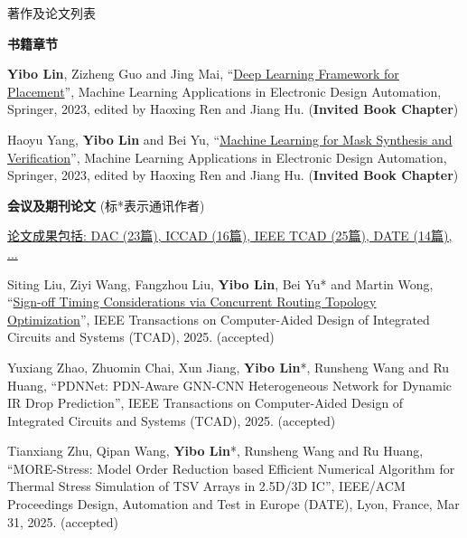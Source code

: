 \begin{rSection}{著作及论文列表}



\textbf{书籍章节}
        

\begin{description}[font=\normalfont, rightmargin=2em]
    

\item[{[B3]}]{
        \textbf{Yibo Lin}, Zizheng Guo and Jing Mai, 
    ``\href{https://doi.org/10.1007/978-3-031-13074-8}{Deep Learning Framework for Placement}'', 
    Machine Learning Applications in Electronic Design Automation, Springer, 2023, edited by Haoxing Ren and Jiang Hu.
    (\textbf{Invited Book Chapter})
}
            

\item[{[B2]}]{
        Haoyu Yang, \textbf{Yibo Lin} and Bei Yu, 
    ``\href{https://doi.org/10.1007/978-3-031-13074-8}{Machine Learning for Mask Synthesis and Verification}'', 
    Machine Learning Applications in Electronic Design Automation, Springer, 2023, edited by Haoxing Ren and Jiang Hu.
    (\textbf{Invited Book Chapter})
}
            

\end{description}
    

\textbf{会议及期刊论文} (标*表示通讯作者)
        

            \underline{论文成果包括: DAC (23篇), ICCAD (16篇), IEEE TCAD (25篇), DATE (14篇), ...} 
    

\begin{description}[font=\normalfont, rightmargin=2em]
    

\item[{[J173]}]{
        Siting Liu, Ziyi Wang, Fangzhou Liu, \textbf{Yibo Lin}, Bei Yu* and Martin Wong, 
    ``\href{https://doi.org/10.1109/TCAD.2024.3506216}{Sign-off Timing Considerations via Concurrent Routing Topology Optimization}'', 
    IEEE Transactions on Computer-Aided Design of Integrated Circuits and Systems (TCAD), 2025.
    (accepted)
}
            

\item[{[J172]}]{
        Yuxiang Zhao, Zhuomin Chai, Xun Jiang, \textbf{Yibo Lin}*, Runsheng Wang and Ru Huang, 
    ``PDNNet: PDN-Aware GNN-CNN Heterogeneous Network for Dynamic IR Drop Prediction'', 
    IEEE Transactions on Computer-Aided Design of Integrated Circuits and Systems (TCAD), 2025.
    (accepted)
}
            

\item[{[C171]}]{
        Tianxiang Zhu, Qipan Wang, \textbf{Yibo Lin}*, Runsheng Wang and Ru Huang, 
    ``MORE-Stress: Model Order Reduction based Efficient Numerical Algorithm for Thermal Stress Simulation of TSV Arrays in 2.5D/3D IC'', 
    IEEE/ACM Proceedings Design, Automation and Test in Europe (DATE), Lyon, France, Mar 31, 2025.
    (accepted)
}
            


\end{description}
\end{rSection}
